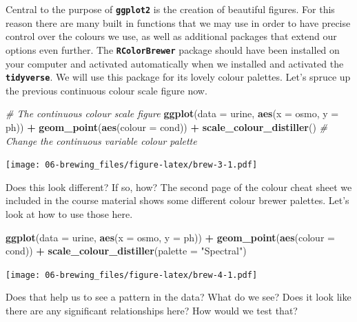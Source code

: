 \documentclass[]{book}
\newenvironment{Shaded}{\begin{snugshade}}{\end{snugshade}}
\newcommand{\KeywordTok}[1]{\textcolor[rgb]{0.13,0.29,0.53}{\textbf{#1}}}
\newcommand{\DataTypeTok}[1]{\textcolor[rgb]{0.13,0.29,0.53}{#1}}
\newcommand{\StringTok}[1]{\textcolor[rgb]{0.31,0.60,0.02}{#1}}
\newcommand{\CommentTok}[1]{\textcolor[rgb]{0.56,0.35,0.01}{\textit{#1}}}
\newcommand{\OperatorTok}[1]{\textcolor[rgb]{0.81,0.36,0.00}{\textbf{#1}}}
\newcommand{\NormalTok}[1]{#1}
\theoremstyle{definition}
\theoremstyle{definition}
\theoremstyle{definition}
\theoremstyle{remark}
\begin{document}
Central to the purpose of \textbf{\texttt{ggplot2}} is the creation of
beautiful figures. For this reason there are many built in functions
that we may use in order to have precise control over the colours we
use, as well as additional packages that extend our options even
further. The \textbf{\texttt{RColorBrewer}} package should have been
installed on your computer and activated automatically when we installed
and activated the \textbf{\texttt{tidyverse}}. We will use this package
for its lovely colour palettes. Let's spruce up the previous continuous
colour scale figure now.

\begin{Shaded}
\begin{Highlighting}[]
\CommentTok{# The continuous colour scale figure}
\KeywordTok{ggplot}\NormalTok{(}\DataTypeTok{data =}\NormalTok{ urine, }\KeywordTok{aes}\NormalTok{(}\DataTypeTok{x =}\NormalTok{ osmo, }\DataTypeTok{y =}\NormalTok{ ph)) }\OperatorTok{+}
\StringTok{  }\KeywordTok{geom_point}\NormalTok{(}\KeywordTok{aes}\NormalTok{(}\DataTypeTok{colour =}\NormalTok{ cond)) }\OperatorTok{+}
\StringTok{  }\KeywordTok{scale_colour_distiller}\NormalTok{() }\CommentTok{# Change the continuous variable colour palette}
\end{Highlighting}
\end{Shaded}

\texttt{[image: 06-brewing\_files/figure-latex/brew-3-1.pdf]}

Does this look different? If so, how? The second page of the colour
cheat sheet we included in the course material shows some different
colour brewer palettes. Let's look at how to use those here.

\begin{Shaded}
\begin{Highlighting}[]
\KeywordTok{ggplot}\NormalTok{(}\DataTypeTok{data =}\NormalTok{ urine, }\KeywordTok{aes}\NormalTok{(}\DataTypeTok{x =}\NormalTok{ osmo, }\DataTypeTok{y =}\NormalTok{ ph)) }\OperatorTok{+}
\StringTok{  }\KeywordTok{geom_point}\NormalTok{(}\KeywordTok{aes}\NormalTok{(}\DataTypeTok{colour =}\NormalTok{ cond)) }\OperatorTok{+}
\StringTok{  }\KeywordTok{scale_colour_distiller}\NormalTok{(}\DataTypeTok{palette =} \StringTok{"Spectral"}\NormalTok{)}
\end{Highlighting}
\end{Shaded}

\texttt{[image: 06-brewing\_files/figure-latex/brew-4-1.pdf]}

Does that help us to see a pattern in the data? What do we see? Does it
look like there are any significant relationships here? How would we
test that?
\end{document}
